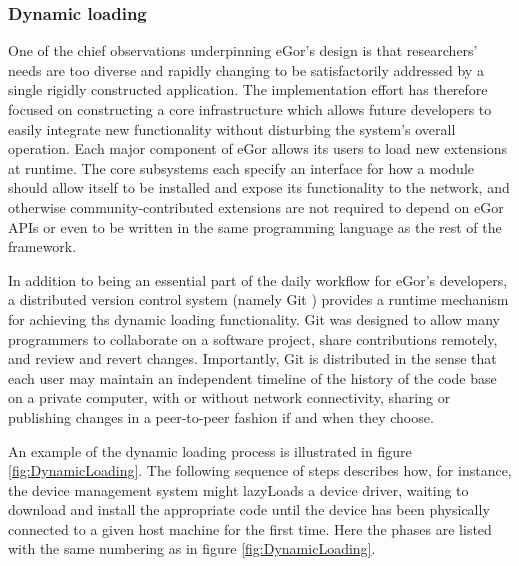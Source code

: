 \documentclass[../thesis]{subfiles}
\begin{document}
\subsubsection{Dynamic loading}
One of the chief observations underpinning eGor's design is that
researchers' needs are too diverse and rapidly changing to be
satisfactorily addressed by a single rigidly constructed
application. The implementation effort has therefore focused on
constructing a core infrastructure which allows future developers to
easily integrate new functionality without disturbing the system's
overall operation. Each major component of eGor allows its users to
load new extensions at runtime. The core subsystems each specify an
interface for how a module should allow itself to be installed and
expose its functionality to the network, and otherwise
community-contributed extensions are not required to depend on eGor
APIs or even to be written in the same programming language as the
rest of the framework.

In addition to being an essential part of the daily workflow for
eGor's developers, a distributed version control system (namely Git
\cite{Git}) provides a runtime mechanism for achieving ths dynamic
loading functionality. Git was designed to allow many programmers to
collaborate on a software project, share contributions remotely, and
review and revert changes. Importantly, Git is distributed in the
sense that each user may maintain an independent timeline of the
history of the code base on a private computer, with or without
network connectivity, sharing or publishing changes in a peer-to-peer
fashion if and when they choose.

An example of the dynamic loading process is illustrated in figure
\ref{fig:DynamicLoading}. The following sequence of steps describes
how, for instance, the device management system might \glspl{lazyLoad} a
device driver, waiting to download and install the appropriate code
until the device has been physically connected to a given host machine
for the first time. Here the phases are listed with the same numbering
as in figure \ref{fig:DynamicLoading}.
\end{document}

